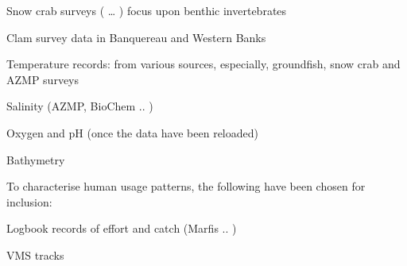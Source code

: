 \documentclass[letterpaper,portrait,12pt]{scrartcl}
\numberwithin{equation}{section}		%
\numberwithin{figure}{section}			%
\numberwithin{table}{section}				%
\begin{document}
\begin{flushleft}

	Snow crab surveys ( \ldots{} ) focus upon benthic invertebrates

\end{flushleft}


\begin{flushleft}

	Clam survey data in Banquereau and Western Banks

\end{flushleft}


\begin{flushleft}

	Temperature records: from various sources, especially, groundfish, snow crab and AZMP surveys

\end{flushleft}


\begin{flushleft}

	Salinity (AZMP, BioChem .. )

\end{flushleft}


\begin{flushleft}

	Oxygen and pH (once the data have been reloaded)

\end{flushleft}


\begin{flushleft}

	Bathymetry

\end{flushleft}


















To characterise human usage patterns, the following have been chosen for inclusion:



\begin{flushleft}

	Logbook records of effort and catch (Marfis .. )

\end{flushleft}


\begin{flushleft}

	VMS tracks

\end{flushleft}
\end{document}
